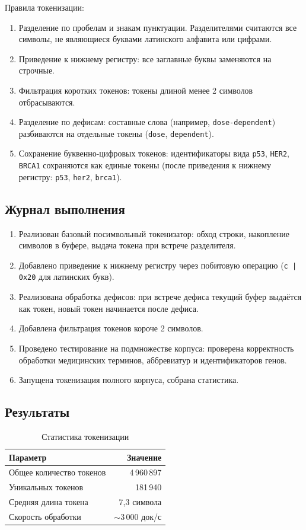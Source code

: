 \documentclass[a4paper,12pt]{article}
\begin{document}
Правила токенизации:
\begin{enumerate}
    \item Разделение по пробелам и знакам пунктуации. Разделителями считаются все символы, не являющиеся буквами латинского алфавита или цифрами.
    \item Приведение к нижнему регистру: все заглавные буквы заменяются на строчные.
    \item Фильтрация коротких токенов: токены длиной менее 2 символов отбрасываются.
    \item Разделение по дефисам: составные слова (например, \texttt{dose-dependent}) разбиваются на отдельные токены (\texttt{dose}, \texttt{dependent}).
    \item Сохранение буквенно-цифровых токенов: идентификаторы вида \texttt{p53}, \texttt{HER2}, \texttt{BRCA1} сохраняются как единые токены (после приведения к нижнему регистру: \texttt{p53}, \texttt{her2}, \texttt{brca1}).
\end{enumerate}

\subsection{Журнал выполнения}

\begin{enumerate}
    \item Реализован базовый посимвольный токенизатор: обход строки, накопление символов в буфере, выдача токена при встрече разделителя.
    \item Добавлено приведение к нижнему регистру через побитовую операцию (\texttt{c | 0x20} для латинских букв).
    \item Реализована обработка дефисов: при встрече дефиса текущий буфер выдаётся как токен, новый токен начинается после дефиса.
    \item Добавлена фильтрация токенов короче 2 символов.
    \item Проведено тестирование на подмножестве корпуса: проверена корректность обработки медицинских терминов, аббревиатур и идентификаторов генов.
    \item Запущена токенизация полного корпуса, собрана статистика.
\end{enumerate}

\subsection{Результаты}

\begin{table}[H]
\centering
\caption{Статистика токенизации}
\begin{tabular}{lr}
\toprule
\textbf{Параметр} & \textbf{Значение} \\
\midrule
Общее количество токенов     & 4\,960\,897 \\
Уникальных токенов            & 181\,940 \\
Средняя длина токена          & 7{,}3 символа \\
Скорость обработки            & $\sim$3\,000 док/с \\
\bottomrule
\end{tabular}
\end{table}
\end{document}
